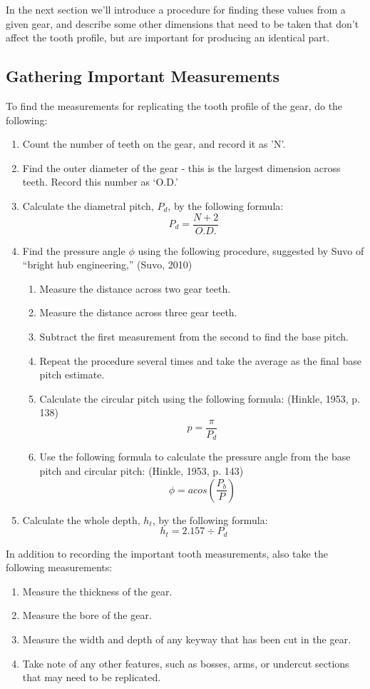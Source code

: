 \documentclass[12pt,twoside,letterpaper]{article}
\begin{document}
In the next section we'll introduce a procedure for finding these values from a given gear, and describe some other dimensions that need to be taken that don't affect the tooth profile, but are important for producing an identical part.


\subsection{Gathering Important Measurements}

To find the measurements for replicating the tooth profile of the gear, do the following:

\begin{enumerate}
\item Count the number of teeth on the gear, and record it as 'N'.
\item Find the outer diameter of the gear - this is the largest dimension across teeth. Record this number as `O.D.'
\item Calculate the diametral pitch, $P_d$, by the following formula:
	\[P_d  = \frac{N+2}{O.D.}\]
\item Find the pressure angle $\phi$ using the following procedure, suggested by Suvo of ``bright hub engineering,'' (Suvo, 2010)
	\begin{enumerate}
		\item Measure the distance across two gear teeth.
		\item Measure the distance across three gear teeth.
		\item Subtract the first measurement from the second to find the base pitch.
		\item Repeat the procedure several times and take the average as the final base pitch estimate.
		\item Calculate the circular pitch using the following formula: (Hinkle, 1953, p. 138)
			\[p = \frac{\pi}{P_d}\]
		\item Use the following formula to calculate the pressure angle from the base pitch and circular pitch: (Hinkle, 1953, p. 143)
			\[\phi = acos(\frac{P_b}{P})\]
	\end{enumerate}
\item Calculate the whole depth, $h_t$, by the following formula:
  \[ h_t = 2.157 \div P_d \]
\end{enumerate}

In addition to recording the important tooth measurements, also take the following measurements:
\begin{enumerate}
	\item Measure the thickness of the gear.
	\item Measure the bore of the gear.
	\item Measure the width and depth of any keyway that has been cut in the gear.
	\item Take note of any other features, such as bosses, arms, or undercut sections that may need to be replicated.
\end{enumerate}
\end{document}

